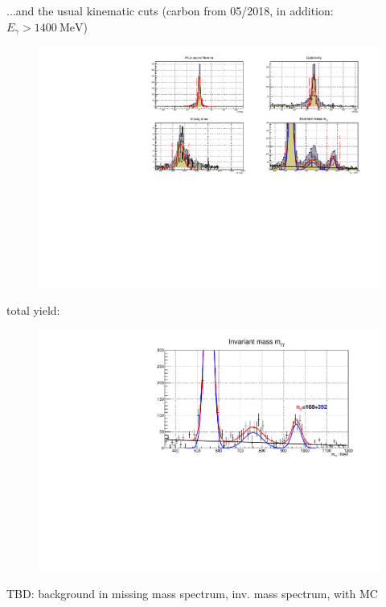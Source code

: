 \documentclass[11pt,aspectratio=1610,dvipsnames]{beamer}
\begin{document}
\begin{frame}{}
...and the usual kinematic cuts (carbon from 05/2018, in addition: $E_\gamma>\SI{1400}{\mega\eV}$)
	\begin{figure}
		\centering
		\includegraphics[width=\linewidth]{../../figs/cuts.pdf}
	\end{figure}
\end{frame}	
\begin{frame}{}
total yield:
	\begin{figure}
		\centering
		\includegraphics[width=\linewidth]{../../figs/etap_yield_total.pdf}
	\end{figure}
TBD: background in missing mass spectrum, inv. mass spectrum, with MC
\end{frame}	
\end{document}
